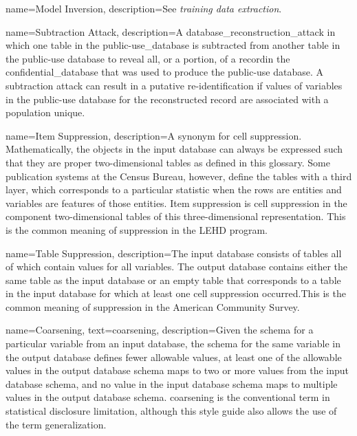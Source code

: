 {
    name=Model Inversion,
    description={See \textit{training data extraction}.}
}

{
    name=Subtraction Attack,
    description={A \gls{database_reconstruction_attack} in which one table in the \gls{public-use_database} is subtracted from another table in the public-use database to reveal all, or a portion, of a \gls{record}in the \gls{confidential_database} that was used to produce the public-use database. A subtraction attack can result in a putative re-identification if values of variables in the public-use database for the reconstructed record are associated with a population unique.}
}

{
    name=Item Suppression,
    description={A synonym for cell suppression. Mathematically, the objects in the input database can always be expressed such that they are proper two-dimensional tables as defined in this glossary. Some publication systems at the Census Bureau, however, define the tables with a third layer, which corresponds to a particular statistic when the rows are entities and variables are features of those entities. Item suppression is cell suppression in the component two-dimensional tables of this three-dimensional representation. This is the common meaning of suppression in the LEHD program.}
}

{
    name=Table Suppression,
    description={The input database consists of tables all of which contain values for all variables. The output database contains either the same table as the input database or an empty table that corresponds to a table in the input database for which at least one cell suppression occurred.This is the common meaning of suppression in the American Community Survey.}
}



{
    name=Coarsening,
    text=coarsening,
    description={Given the schema for a particular variable from an input database, the schema for the same variable in the output database defines fewer allowable values, at least one of the allowable values in the output database schema maps to two or more values from the input database schema, and no value in the input database schema maps to multiple values in the output database schema. \Gls{coarsening} is the conventional term in statistical disclosure limitation, although this style guide also allows the use of the term \gls{generalization}.}
}

